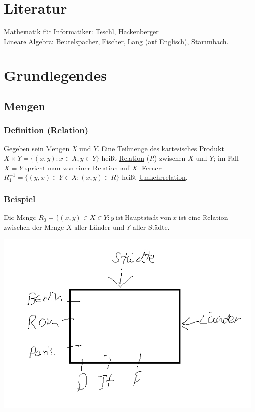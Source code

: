 \tableofcontents
\pagebreak
{}
\section*{Literatur}
\underline{Mathematik für Informatiker: } Teschl, Hackenberger \\
\underline{Lineare Algebra: } Beutelspacher, Fischer, Lang (auf Englisch), Stammbach.
\section{Grundlegendes}
\subsection{Mengen}
\subsubsection{Definition (Relation)}
Gegeben sein Mengen $X$ und $Y$.  Eine Teilmenge des kartesisches Produkt $X\times Y=\{(x,y):x\in X, y\in Y\}$ heißt \underline{Relation} ($R$) zwischen $X$ und $Y$; im Fall $X=Y$ spricht man von einer Relation auf $X$.  Ferner: $R^{-1}_1=\{(y,x)\in Y \in X: (x,y)\in R\}$ heißt \underline{Umkehrrelation}.
\subsubsection{Beispiel}
Die Menge $R_0=\{(x,y)\in X\in Y: y \mathrm{\ ist\ Hauptstadt\ von\ } x$ ist eine Relation zwischen der Menge $X$ aller Länder und $Y$ aller Städte. \\
\begin{center}
\includegraphics[scale=0.4]{1-1-2.jpg}
\end{center}

